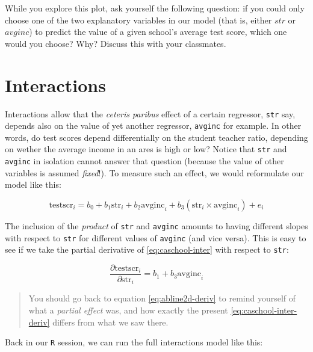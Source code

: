 \documentclass[]{book}
\begin{document}
While you explore this plot, ask yourself the following question: if you
could only choose one of the two explanatory variables in our model
(that is, either \(str\) or \(avginc\)) to predict the value of a given
school's average test score, which one would you choose? Why? Discuss
this with your classmates.

\section{Interactions}\label{mreg-interactions}

Interactions allow that the \emph{ceteris paribus} effect of a certain
regressor, \texttt{str} say, depends also on the value of yet another
regressor, \texttt{avginc} for example. In other words, do test scores
depend differentially on the student teacher ratio, depending on wether
the average income in an ares is high or low? Notice that \texttt{str}
and \texttt{avginc} in isolation cannot answer that question (because
the value of other variables is assumed \emph{fixed}!). To measure such
an effect, we would reformulate our model like this:

\begin{equation}
\text{testscr}_i = b_0 + b_1  \text{str}_i + b_2  \text{avginc}_i + b_3 (\text{str}_i \times  \text{avginc}_i)+ e_i \label{eq:caschool-inter}
\end{equation}

The inclusion of the \emph{product} of \texttt{str} and \texttt{avginc}
amounts to having different slopes with respect to \texttt{str} for
different values of \texttt{avginc} (and vice versa). This is easy to
see if we take the partial derivative of \eqref{eq:caschool-inter} with
respect to \texttt{str}:

\begin{equation}
\frac{\partial \text{testscr}_i}{\partial \text{str}_i} = b_1 + b_3 \text{avginc}_i \label{eq:caschool-inter-deriv}
\end{equation}

\begin{quote}
You should go back to equation \eqref{eq:abline2d-deriv} to remind
yourself of what a \emph{partial effect} was, and how exactly the
present \eqref{eq:caschool-inter-deriv} differs from what we saw there.
\end{quote}

Back in our \texttt{R} session, we can run the full interactions model
like this:
\end{document}

